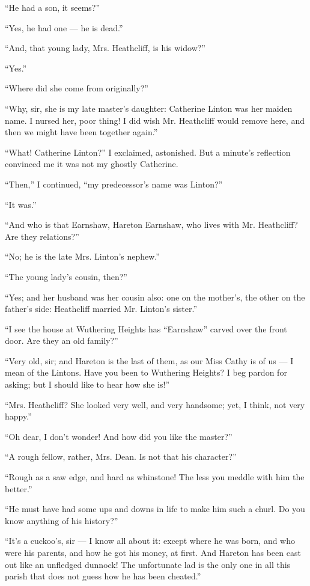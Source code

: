 \par “He had a son, it seems?”
\par “Yes, he had one — he is dead.”
\par “And, that young lady, Mrs. Heathcliff, is his widow?”
\par “Yes.”
\par “Where did she come from originally?”
\par “Why, sir, she is my late master's daughter: Catherine Linton was her maiden name. I nursed her, poor thing! I did wish Mr. Heathcliff would remove here, and then we might have been together again.”
\par “What! Catherine Linton?” I exclaimed, astonished. But a minute's reflection convinced me it was not my ghostly Catherine.
\par “Then,” I continued, “my predecessor's name was Linton?”
\par “It was.”
\par “And who is that Earnshaw, Hareton Earnshaw, who lives with Mr. Heathcliff? Are they relations?”
\par “No; he is the late Mrs. Linton's nephew.”
\par “The young lady's cousin, then?”
\par “Yes; and her husband was her cousin also: one on the mother's, the other on the father's side: Heathcliff married Mr. Linton's sister.”
\par “I see the house at Wuthering Heights has “Earnshaw” carved over the front door. Are they an old family?”
\par “Very old, sir; and Hareton is the last of them, as our Miss Cathy is of us — I mean of the Lintons. Have you been to Wuthering Heights? I beg pardon for asking; but I should like to hear how she is!”
\par “Mrs. Heathcliff? She looked very well, and very handsome; yet, I think, not very happy.”
\par “Oh dear, I don't wonder! And how did you like the master?”
\par “A rough fellow, rather, Mrs. Dean. Is not that his character?”
\par “Rough as a saw edge, and hard as whinstone! The less you meddle with him the better.”
\par “He must have had some ups and downs in life to make him such a churl. Do you know anything of his history?”
\par “It's a cuckoo's, sir — I know all about it: except where he was born, and who were his parents, and how he got his money, at first. And Hareton has been cast out like an unfledged dunnock! The unfortunate lad is the only one in all this parish that does not guess how he has been cheated.”
